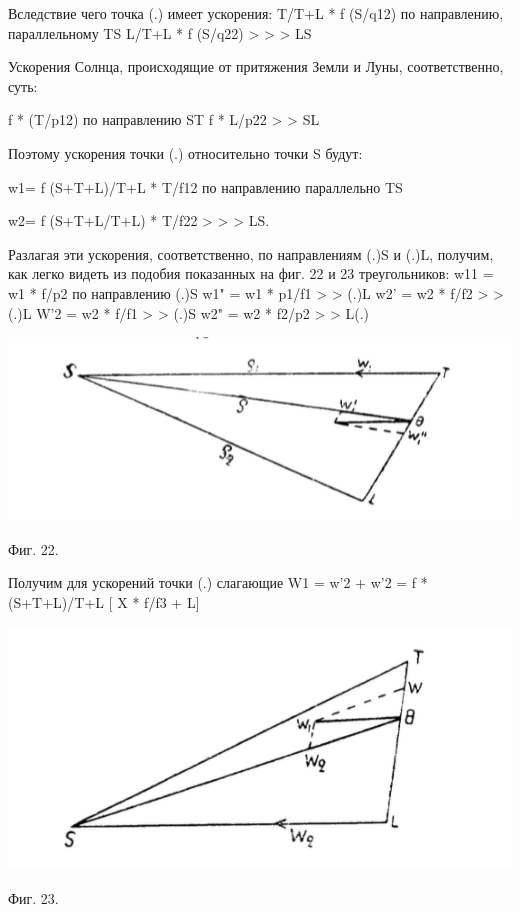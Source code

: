 \documentclass[a4paper,12pt]{article}
\begin{document}
Вследствие чего точка (.) имеет ускорения:
T/T+L * f (S/q12) по направлению, параллельному TS
L/T+L * f (S/q22) > > > LS

Ускорения Солнца, происходящие от притяжения Земли и Луны, соответственно, суть:

f * (T/p12) по направлению ST
f * L/p22 > > SL

Поэтому ускорения точки (.) относительно точки S будут:

w1= f (S+T+L)/T+L * T/f12 по направлению параллельно TS

w2= f (S+T+L/T+L) * T/f22 > > > LS.

Разлагая эти ускорения, соответственно, по направлениям (.)S и (.)L, получим, как легко видеть из подобия показанных на фиг. 22 и 23 треугольников:
w11 = w1 * f/p2 по направлению (.)S
w1" = w1 * p1/f1 > > (.)L
w2' = w2 * f/f2  > > (.)L
W'2 = w2 * f/f1  > > (.)S
w2" = w2 * f2/p2 > > L(.)

\begin{center}
    \includegraphics{22.png}
\end{center}
Фиг. 22.

Получим для ускорений точки (.) слагающие
W1 = w'2 + w'2 = f * (S+T+L)/T+L [ X * f/f3 + L]

\begin{center}
    \includegraphics{23.png}
\end{center}
Фиг. 23.
\end{document}
